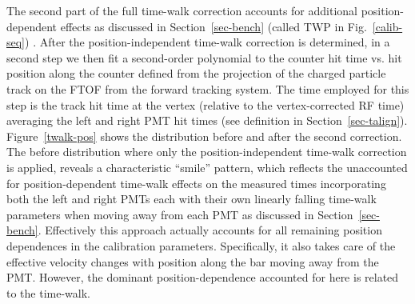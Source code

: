 \documentclass[3p,times,twocolumn]{elsarticle}
\begin{document}
The second part of the full time-walk correction accounts for additional position-dependent effects as
discussed in Section~\ref{sec-bench} (called TWP in Fig.~\ref{calib-seq}) . After the position-independent
time-walk correction is determined, in a second step we then fit a second-order polynomial to the counter hit time
vs. hit position along the counter defined from the projection of the charged particle track on the FTOF from
the forward tracking system. The time employed for this step is the track hit time at the vertex (relative
to the vertex-corrected RF time) averaging the left and right PMT hit times (see definition in
Section~\ref{sec-talign}). Figure~\ref{twalk-pos} shows the distribution before and after the second correction.
The before distribution where only the position-independent time-walk correction is applied, reveals a
characteristic ``smile'' pattern, which reflects the unaccounted for position-dependent time-walk effects on
the measured times incorporating both the left and right PMTs each with their own linearly falling time-walk
parameters when moving away from each PMT as discussed in Section~\ref{sec-bench}. Effectively this approach
actually accounts for all remaining position dependences in the calibration parameters. Specifically, it also takes
care of the effective velocity changes with position along the bar moving away from the PMT. However, the
dominant position-dependence accounted for here is related to the time-walk.
\end{document}
